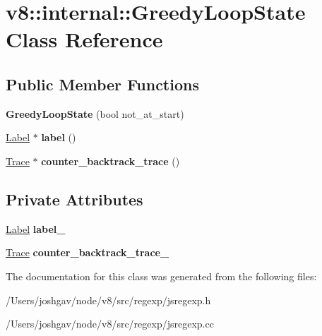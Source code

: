 \hypertarget{classv8_1_1internal_1_1_greedy_loop_state}{}\section{v8\+:\+:internal\+:\+:Greedy\+Loop\+State Class Reference}
\label{classv8_1_1internal_1_1_greedy_loop_state}
\subsection*{Public Member Functions}
\begin{DoxyCompactItemize}
\item 
{\bfseries Greedy\+Loop\+State} (bool not\+\_\+at\+\_\+start)\hypertarget{classv8_1_1internal_1_1_greedy_loop_state_ae1073242c409634af36abee3ffa76005}{}\label{classv8_1_1internal_1_1_greedy_loop_state_ae1073242c409634af36abee3ffa76005}

\item 
\hyperlink{classv8_1_1internal_1_1_label}{Label} $\ast$ {\bfseries label} ()\hypertarget{classv8_1_1internal_1_1_greedy_loop_state_aedb4d5d546a88b1fdc13472a13053d40}{}\label{classv8_1_1internal_1_1_greedy_loop_state_aedb4d5d546a88b1fdc13472a13053d40}

\item 
\hyperlink{classv8_1_1internal_1_1_trace}{Trace} $\ast$ {\bfseries counter\+\_\+backtrack\+\_\+trace} ()\hypertarget{classv8_1_1internal_1_1_greedy_loop_state_a3ea9b79d50f954687dc2b2b862c55c2f}{}\label{classv8_1_1internal_1_1_greedy_loop_state_a3ea9b79d50f954687dc2b2b862c55c2f}

\end{DoxyCompactItemize}
\subsection*{Private Attributes}
\begin{DoxyCompactItemize}
\item 
\hyperlink{classv8_1_1internal_1_1_label}{Label} {\bfseries label\+\_\+}\hypertarget{classv8_1_1internal_1_1_greedy_loop_state_aa1eb6d300b9199f6a261278395537b1e}{}\label{classv8_1_1internal_1_1_greedy_loop_state_aa1eb6d300b9199f6a261278395537b1e}

\item 
\hyperlink{classv8_1_1internal_1_1_trace}{Trace} {\bfseries counter\+\_\+backtrack\+\_\+trace\+\_\+}\hypertarget{classv8_1_1internal_1_1_greedy_loop_state_a526e90cddc3502a0b2502bfd67790a25}{}\label{classv8_1_1internal_1_1_greedy_loop_state_a526e90cddc3502a0b2502bfd67790a25}

\end{DoxyCompactItemize}


The documentation for this class was generated from the following files\+:\begin{DoxyCompactItemize}
\item 
/\+Users/joshgav/node/v8/src/regexp/jsregexp.\+h\item 
/\+Users/joshgav/node/v8/src/regexp/jsregexp.\+cc\end{DoxyCompactItemize}

